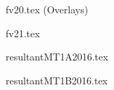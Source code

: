 \documentclass[9pt,xcolor={svgnames, x11names}]{beamer}
\def\scale{1} %
\begin{document}
\begin{frame}{fv20.tex (Overlays)}
	\def\scale{0.8}
	\centering
	
\end{frame}
\begin{frame}{fv21.tex}
	\def\scale{1}
	\centering
	
\end{frame}
\begin{frame}{resultantMT1A2016.tex}
	\def\scale{0.8}
	\centering
	
\end{frame}

\begin{frame}{resultantMT1B2016.tex}
	\def\scale{0.8}
	\centering
	
\end{frame}


\end{document}
